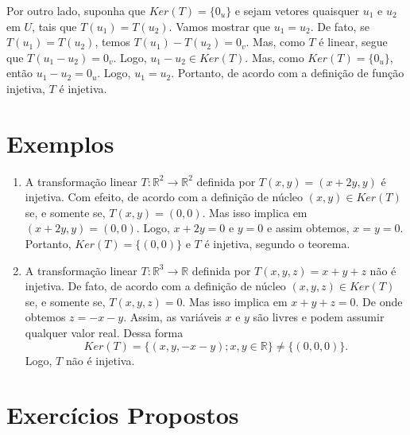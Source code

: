 Por outro lado, suponha que  $ Ker(T)= \{0_u\}$ e sejam vetores quaisquer $u_1$ e $u_2$ em $U$, tais que $T(u_1)=T(u_2)$. Vamos mostrar que $u_1=u_2$. De fato, se $T(u_1)=T(u_2)$, temos $T(u_1)-T(u_2)=0_v$. Mas, como $T$ é linear, segue que $T(u_1-u_2)=0_v$. Logo, $u_1-u_2 \in Ker(T)$. Mas, como $ Ker(T)= \{0_u\}$, então $u_1-u_2=0_u$. Logo, $u_1=u_2$. Portanto, de acordo com a definição de função injetiva,  $T$ é injetiva.




\vspace{1cm}

\section{Exemplos}


\begin{enumerate}
\item  A transformação linear $T: \mathbb{R}^2 \rightarrow \mathbb{R}^2$ definida por $T(x,y)=(x+2y,y)$ é injetiva. Com efeito, de acordo com a definição de núcleo $(x,y) \in Ker(T)$ se, e somente se, $T(x,y)=(0,0)$. Mas isso implica em $(x+2y, y)=(0,0)$. Logo, $x+2y=0$ e $y=0$ e assim obtemos, $x=y=0$. Portanto,  $Ker(T)=\{(0,0)\}$ e $T$ é injetiva, segundo o teorema.

\item A transformação linear $T: \mathbb{R}^3 \rightarrow \mathbb{R}$ definida por $T(x,y,z)=x+y+z$ não é injetiva. De fato, de acordo com a definição de núcleo $(x,y,z) \in Ker(T)$ se, e somente se, $T(x,y,z)=0$. Mas isso implica em $x+y+z=0$. De onde obtemos  $z=-x-y$. Assim, as variáveis $x$ e $y$ são livres e podem assumir qualquer valor real. Dessa forma   $$Ker(T)=\{(x,y, -x-y); x, y \in \mathbb{R}\} \neq \{ (0,0,0)\}.$$  Logo,  $T$ não é injetiva.

\end{enumerate}

\section{Exercícios Propostos}

